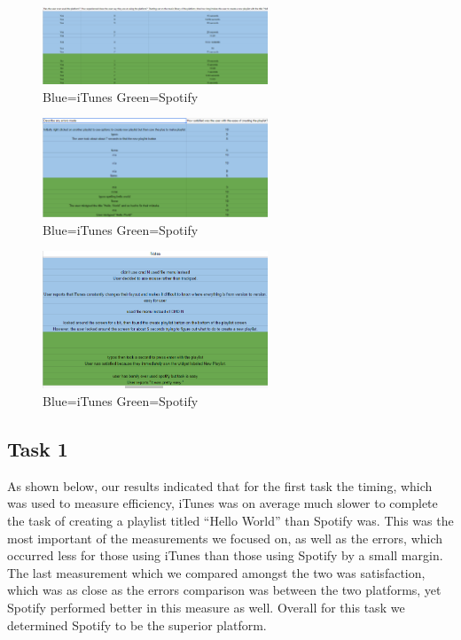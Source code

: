 \documentclass[a4paper]{article}
\begin{document}
\begin{figure}[H]
\centering
\includegraphics[width=0.6\textwidth]{tasks1.PNG}
\caption{\label{task:tasks1.1}Blue=iTunes  Green=Spotify}
\end{figure}
\begin{figure}[H]
\centering
\includegraphics[width=0.6\textwidth]{tasks2.PNG}
\caption{\label{task:tasks1.2}Blue=iTunes  Green=Spotify}
\end{figure}
\begin{figure}[H]
\centering
\includegraphics[width=0.6\textwidth]{tasks3.PNG}
\caption{\label{task:tasks1.3}Blue=iTunes  Green=Spotify}
\end{figure}

\subsection{Task 1}


As shown below, our results indicated that for the first task the timing, which was used to measure efficiency, iTunes was on average much slower to complete the task of creating a playlist titled ``Hello World'' than Spotify was. This was the most important of the measurements we focused on, as well as the errors, which occurred less for those using iTunes than those using Spotify by a small margin. The last measurement which we compared amongst the two was satisfaction, which was as close as the errors comparison was between the two platforms, yet Spotify performed better in this measure as well. Overall for this task we determined Spotify to be the superior platform. 
\end{document}
